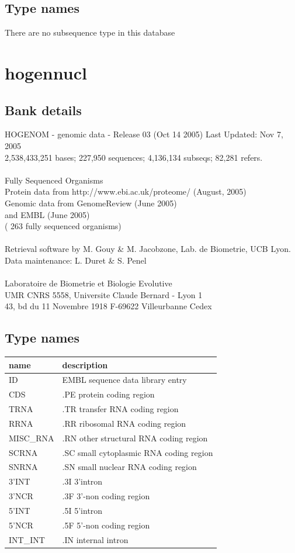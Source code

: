 \documentclass{article}
\begin{document}
\begin{Schunk}
\subsection{Type names}
There are no subsequence type in this database
\section{ hogennucl }
\subsection{Bank details}
HOGENOM - genomic data - Release 03 (Oct 14 2005) Last Updated: Nov  7, 2005\\
2,538,433,251 bases; 227,950 sequences; 4,136,134 subseqs; 82,281 refers.\\
\\
Fully Sequenced Organisms\\
Protein data from http://www.ebi.ac.uk/proteome/ (August, 2005)\\
Genomic data from GenomeReview  (June 2005)\\
and  EMBL (June 2005)\\
( 263 fully sequenced organisms)\\
\\
Retrieval software by M. Gouy \& M. Jacobzone, Lab. de Biometrie, UCB Lyon.\\
Data maintenance: L. Duret \& S. Penel\\
\\
Laboratoire de Biometrie et Biologie Evolutive\\
UMR CNRS 5558, Universite Claude Bernard - Lyon 1\\
43, bd du 11 Novembre 1918 F-69622 Villeurbanne Cedex\\


\subsection{Type names}
\noindent\begin{tabular}{ll}
\hline \hline
name & description\\
\hline
ID & EMBL sequence data library entry \\
CDS & .PE protein coding region \\
TRNA & .TR transfer RNA coding region \\
RRNA & .RR ribosomal RNA coding region \\
MISC\_RNA & .RN other structural RNA coding region \\
SCRNA & .SC small cytoplasmic RNA coding region \\
SNRNA & .SN small nuclear RNA coding region \\
3'INT & .3I 3'intron \\
3'NCR & .3F  3'-non coding region \\
5'INT & .5I 5'intron \\
5'NCR & .5F  5'-non coding region \\
INT\_INT & .IN  internal intron \\
\hline \hline
\end{tabular}


\end{Schunk}
\end{document}
